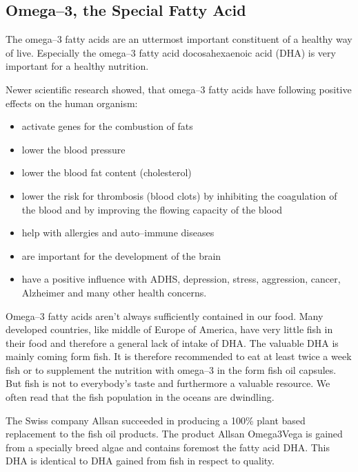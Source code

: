 \documentclass[../main.tex]{subfiles}
\begin{document}
\subsection{Omega--3, the Special Fatty Acid}
The omega--3 fatty acids are an uttermost important constituent of a healthy way of live.
Especially the omega--3 fatty acid docosahexaenoic acid (DHA) is very important for a healthy nutrition.

Newer scientific research showed, that omega--3 fatty acids have following positive effects on the human organism:
\begin{itemize}
\item activate genes for the combustion of fats
\item lower the blood pressure
\item lower the blood fat content (cholesterol)
\item lower the risk for thrombosis (blood clots) by inhibiting the coagulation
  of the blood and by improving the flowing capacity of the blood
  \item help with allergies and auto--immune diseases
  \item are important for the development of the brain
  \item have a positive influence with ADHS, depression, stress, aggression,
    cancer, Alzheimer and many other health concerns.
\end{itemize}

Omega--3 fatty acids aren't always sufficiently contained in our food.
Many developed countries, like middle of Europe of America, have very little fish in their food and therefore a general lack of intake of DHA.
The valuable DHA is mainly coming form fish.
It is therefore recommended to eat at least twice a week fish or to supplement the nutrition with omega--3 in the form fish oil capsules.
But fish is not to everybody's taste and furthermore a valuable resource.
We often read that the fish population in the oceans are dwindling.

The Swiss company Allsan succeeded in producing a 100\% plant based replacement to the fish oil products.
The product Allsan Omega3Vega is gained from a specially breed algae and contains foremost the fatty acid DHA.
This DHA is identical to DHA gained from fish in respect to quality.
\end{document}
